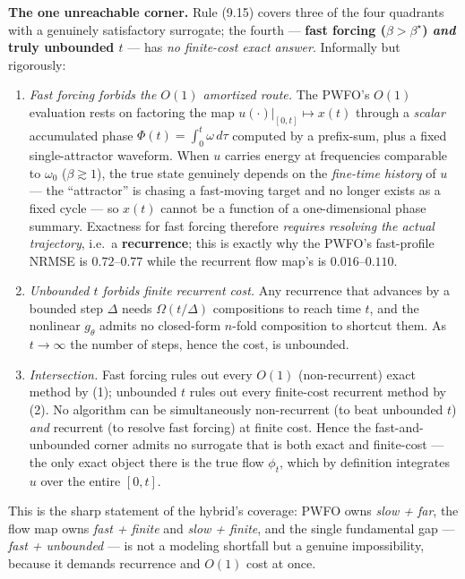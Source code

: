 \documentclass[
  11pt,
]{article}
\providecommand{\gt}{>}
\begin{document}
\textbf{The one unreachable corner.} Rule (9.15) covers three of the
four quadrants with a genuinely satisfactory surrogate; the fourth ---
\textbf{fast forcing (\(\beta\gt \beta^\star\)) \emph{and} truly
unbounded \(t\)} --- has \emph{no finite-cost exact answer}. Informally
but rigorously:

\begin{enumerate}
\def\labelenumi{\arabic{enumi}.}
\item
  \emph{Fast forcing forbids the \(O(1)\) amortized route.} The PWFO's
  \(O(1)\) evaluation rests on factoring the map
  \(u(\cdot)\big|_{[0,t]}\mapsto x(t)\) through a \emph{scalar}
  accumulated phase \(\Phi(t)=\int_0^t\omega\,d\tau\) computed by a
  prefix-sum, plus a fixed single-attractor waveform. When \(u\) carries
  energy at frequencies comparable to \(\omega_0\) (\(\beta\gtrsim1\)),
  the true state genuinely depends on the \emph{fine-time history} of
  \(u\) --- the ``attractor'' is chasing a fast-moving target and no
  longer exists as a fixed cycle --- so \(x(t)\) cannot be a function of
  a one-dimensional phase summary. Exactness for fast forcing therefore
  \emph{requires resolving the actual trajectory}, i.e.~a
  \textbf{recurrence}; this is exactly why the PWFO's fast-profile NRMSE
  is \(0.72\)--\(0.77\) while the recurrent flow map's is
  \(0.016\)--\(0.110\).
\item
  \emph{Unbounded \(t\) forbids finite recurrent cost.} Any recurrence
  that advances by a bounded step \(\Delta\) needs \(\Omega(t/\Delta)\)
  compositions to reach time \(t\), and the nonlinear \(g_\theta\)
  admits no closed-form \(n\)-fold composition to shortcut them. As
  \(t\to\infty\) the number of steps, hence the cost, is unbounded.
\item
  \emph{Intersection.} Fast forcing rules out every \(O(1)\)
  (non-recurrent) exact method by (1); unbounded \(t\) rules out every
  finite-cost recurrent method by (2). No algorithm can be
  simultaneously non-recurrent (to beat unbounded \(t\)) \emph{and}
  recurrent (to resolve fast forcing) at finite cost. Hence the
  fast-and-unbounded corner admits no surrogate that is both exact and
  finite-cost --- the only exact object there is the true flow
  \(\phi_t\), which by definition integrates \(u\) over the entire
  \([0,t]\).
\end{enumerate}

This is the sharp statement of the hybrid's coverage: PWFO owns
\emph{slow + far}, the flow map owns \emph{fast + finite} and \emph{slow
+ finite}, and the single fundamental gap --- \emph{fast + unbounded}
--- is not a modeling shortfall but a genuine impossibility, because it
demands recurrence and \(O(1)\) cost at once.
\end{document}
